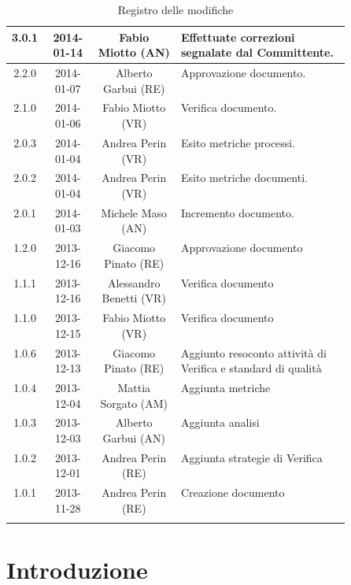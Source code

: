 \begin{center}
\begin{longtable}{|c|c|c|p{0.5\linewidth}|}
\midrule
3.0.1 & 2014-01-14 & Fabio Miotto (AN) & Effettuate correzioni segnalate dal Committente.\\

\midrule
2.2.0 & 2014-01-07 & Alberto Garbui (RE) & Approvazione documento.\\
\midrule
2.1.0 & 2014-01-06 & Fabio Miotto (VR) & Verifica documento.\\
\midrule
2.0.3 & 2014-01-04 & Andrea Perin (VR) & Esito metriche processi.\\
\midrule
2.0.2 & 2014-01-04  & Andrea Perin (VR) & Esito metriche documenti.\\
\midrule
2.0.1 & 2014-01-03  & Michele Maso (AN) & Incremento documento.\\

\midrule
1.2.0 & 2013-12-16 & Giacomo Pinato (RE) & Approvazione documento\\
\midrule
1.1.1 & 2013-12-16 & Alessandro Benetti (VR) & Verifica documento\\
\midrule
1.1.0 & 2013-12-15 & Fabio Miotto (VR) & Verifica documento\\
\midrule
1.0.6 & 2013-12-13 & Giacomo Pinato (RE) & Aggiunto resoconto attività di Verifica e standard di qualità\\
\midrule
1.0.4 & 2013-12-04 & Mattia Sorgato (AM) & Aggiunta metriche\\
\midrule
1.0.3 & 2013-12-03 & Alberto Garbui (AN) & Aggiunta analisi\\
\midrule
1.0.2 & 2013-12-01 & Andrea Perin (RE) & Aggiunta strategie di Verifica\\
\midrule
1.0.1 & 2013-11-28 & Andrea Perin (RE) & Creazione documento\\

\bottomrule
\caption{Registro delle modifiche}
\label{tab:changelog}
\end{longtable}
\end{center}

\newpage
\tableofcontents

\newpage
\listoftables
\listoffigures

\newpage
\section{Introduzione}%
\label{1.0}
